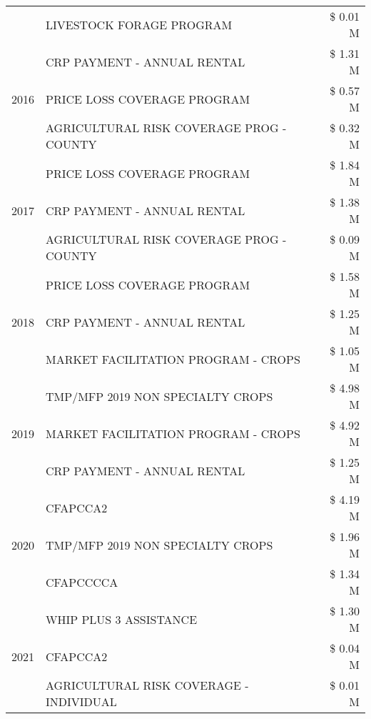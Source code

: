 \begin{tabular}{llr}
 & LIVESTOCK FORAGE PROGRAM & \$ 0.01 M \\
\cline{1-3}
\multirow[t]{3}{*}{2016} & CRP PAYMENT - ANNUAL RENTAL & \$ 1.31 M \\
 & PRICE LOSS COVERAGE PROGRAM & \$ 0.57 M \\
 & AGRICULTURAL RISK COVERAGE PROG - COUNTY & \$ 0.32 M \\
\cline{1-3}
\multirow[t]{3}{*}{2017} & PRICE LOSS COVERAGE PROGRAM & \$ 1.84 M \\
 & CRP PAYMENT - ANNUAL RENTAL & \$ 1.38 M \\
 & AGRICULTURAL RISK COVERAGE PROG - COUNTY & \$ 0.09 M \\
\cline{1-3}
\multirow[t]{3}{*}{2018} & PRICE LOSS COVERAGE PROGRAM & \$ 1.58 M \\
 & CRP PAYMENT - ANNUAL RENTAL & \$ 1.25 M \\
 & MARKET FACILITATION PROGRAM - CROPS & \$ 1.05 M \\
\cline{1-3}
\multirow[t]{3}{*}{2019} & TMP/MFP 2019 NON SPECIALTY CROPS & \$ 4.98 M \\
 & MARKET FACILITATION PROGRAM - CROPS & \$ 4.92 M \\
 & CRP PAYMENT - ANNUAL RENTAL & \$ 1.25 M \\
\cline{1-3}
\multirow[t]{3}{*}{2020} & CFAPCCA2 & \$ 4.19 M \\
 & TMP/MFP 2019 NON SPECIALTY CROPS & \$ 1.96 M \\
 & CFAPCCCCA & \$ 1.34 M \\
\cline{1-3}
\multirow[t]{3}{*}{2021} & WHIP PLUS 3 ASSISTANCE & \$ 1.30 M \\
 & CFAPCCA2 & \$ 0.04 M \\
 & AGRICULTURAL RISK COVERAGE - INDIVIDUAL & \$ 0.01 M \\
\cline{1-3}
\bottomrule
\end{tabular}
